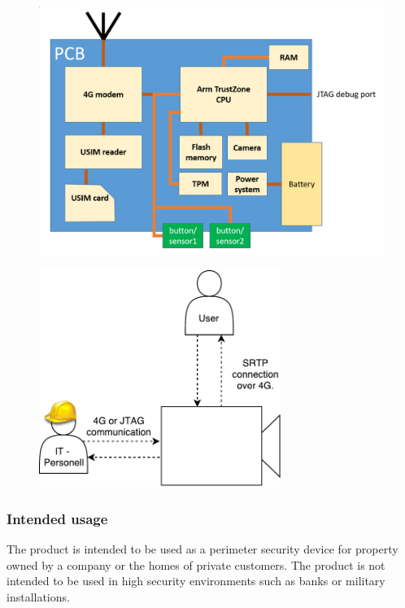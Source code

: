 \documentclass[10pt]{article}
\begin{document}
      \begin{figure}[!h]
        \center
        \includegraphics[width=\textwidth]{input/pcb_camera.png}
      \end{figure}

      \begin{figure}[!h]
        \center
        \includegraphics[width=0.7\textwidth]{input/communication.pdf}
      \end{figure}

      \subsubsection{Intended usage}

        The product is intended to be used as a perimeter security device for
        property owned by a company or the homes of private customers. The
        product is not intended to be used in high security environments such
        as banks or military installations.
\end{document}
